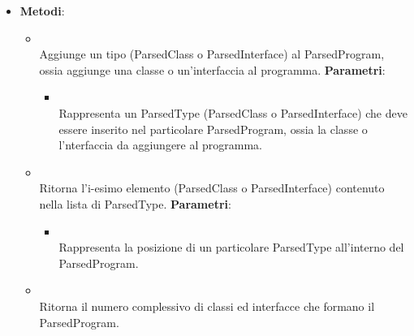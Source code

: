 \begin{itemize}
\item \textbf{Metodi}:
\begin{itemize}
\item {}
\\ Aggiunge un tipo (ParsedClass o ParsedInterface) al ParsedProgram, ossia aggiunge una classe o un'interfaccia al programma.
\textbf{Parametri}:
\begin{itemize}
\item {}
\\ Rappresenta un ParsedType (ParsedClass o ParsedInterface) che deve essere inserito nel particolare ParsedProgram, ossia la classe o l'nterfaccia da aggiungere al programma.
\end{itemize}
\item {}
\\ Ritorna l'i-esimo elemento (ParsedClass o ParsedInterface) contenuto nella lista di ParsedType.
\textbf{Parametri}:
\begin{itemize}
\item {}
\\ Rappresenta la posizione di un particolare ParsedType all'interno del ParsedProgram.
\end{itemize}
\item {}
\\ Ritorna il numero complessivo di classi ed interfacce che formano il ParsedProgram.
\end{itemize}
\end{itemize}

